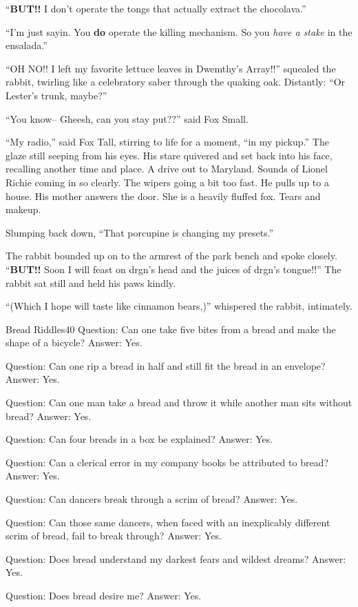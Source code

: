 \documentclass[10pt,twoside]{report}
\begin{document}
``{\bf BUT!!}  I don't operate the tongs that actually extract the
        chocolava.''

``I'm just sayin.  You {\bf do} operate the killing mechanism.  So you
        {\em have a stake} in the ensalada.''

``OH NO!!  I left my favorite lettuce leaves in Dwemthy's Array!!''
        squealed the rabbit, twirling like a celebratory saber through
        the quaking oak.  Distantly: ``Or Lester's trunk, maybe?''

``You know-- Gheesh, can you stay put??'' said Fox Small.

``My radio,'' said Fox Tall, stirring to life for a moment, ``in my
        pickup.''  The glaze still seeping from his eyes.  His stare
        quivered and set back into his face, recalling another time
        and place.  A drive out to Maryland.  Sounds of Lionel Richie
        coming in so clearly.  The wipers going a bit too fast.  He
        pulls up to a house.  His mother answers the door. She is a
        heavily fluffed fox.  Tears and makeup.

Slumping back down, ``That porcupine is changing my presets.''

The rabbit bounded up on to the armrest of the park bench and spoke
closely.  ``{\bf BUT!!} Soon I will feast on drgn's head and the
juices of drgn's tongue!!''  The rabbit sat still and held his paws
kindly.

``(Which I hope will taste like cinnamon bears,)'' whispered the
rabbit, intimately.

	\begin{sidebar}{Bread Riddles}{40}
		Question: Can one take five bites from a bread and make the shape of a bicycle? Answer: Yes.\vspace{6pt}
		
		Question: Can one rip a bread in half and still fit the bread in an envelope? Answer: Yes.\vspace{6pt}
		
		Question: Can one man take a bread and throw it while another man sits without bread? Answer: Yes.\vspace{6pt}
		
		Question: Can four breads in a box be explained? Answer: Yes.\vspace{6pt}
		
		Question: Can a clerical error in my company books be attributed to bread? Answer: Yes.\vspace{6pt}
		
		Question: Can dancers break through a scrim of bread? Answer: Yes.\vspace{6pt}
		
		Question: Can those same dancers, when faced with an inexplicably different scrim of bread, fail to break through? Answer: Yes.\vspace{6pt}
		
		Question: Does bread understand my darkest fears and wildest dreams? Answer: Yes.\vspace{6pt}
		
		Question: Does bread desire me? Answer: Yes.
	\end{sidebar}
\end{document}
